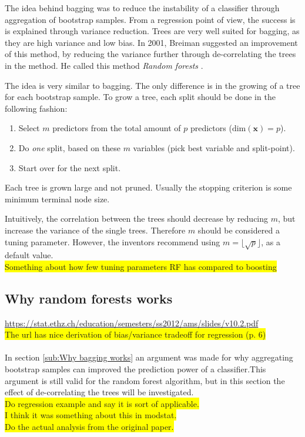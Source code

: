 The idea behind bagging was to reduce the instability of a classifier through aggregation of bootstrap samples. From a regression point of view, the success is is explained through variance reduction. Trees are very well suited for bagging, as they are  high variance and low bias. In 2001, Breiman suggested an improvement of this method, by reducing the variance further through de-correlating the trees in the method. He called this method \textit{Random forests} \cite{randomforests}.

The idea is very similar to bagging. The only difference is in the growing of a tree for each bootstrap sample. To grow a tree, each split should be done in the following fashion:
\begin{enumerate}
  \item Select $m$ predictors from the total amount of $p$ predictors ($\mathrm{dim}(\mathbf{x}) = p$).
  \item Do \textit{one} split, based on these $m$ variables (pick best variable and split-point). 
  \item Start over for the next split.
\end{enumerate}
Each tree is grown large and not pruned. Usually the stopping criterion is some minimum terminal node size.

Intuitively, the correlation between the trees should decrease by reducing $m$, but increase the variance of the single trees. Therefore $m$ should be considered a tuning parameter. However, the inventors recommend using $m = \lfloor \sqrt{p} \rfloor$, as a default value.
\\\colorbox{yellow}{Something about how few tuning parameters RF has compared to boosting}\\

\subsection{Why random forests works}
\label{sub:Why random forests works}
\url{https://stat.ethz.ch/education/semesters/ss2012/ams/slides/v10.2.pdf} \\
\colorbox{yellow}{The url has nice derivation of bias/variance tradeoff for regression (p. 6)}\\
\\
In section \ref{sub:Why bagging works} an argument was made for why aggregating bootstrap samples can improved the prediction power of a classifier.This argument is still valid for the random forest algorithm, but in this section the effect of de-correlating the trees will be investigated.
\\\colorbox{yellow}{Do regression example and say it is sort of applicable.}
\\\colorbox{yellow}{I think it was something about this in modstat.}
\\\colorbox{yellow}{Do the actual analysis from the original paper. }

